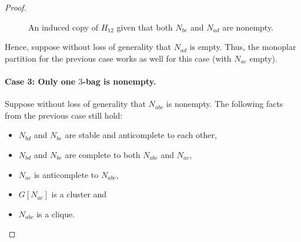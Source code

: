 \begin{proof}
    \begin{figure}[htb!]
        \centering
        \caption{An induced copy of $H_{12}$ given that both $ N_{be}$ and
            $N_{ad}$ are nonempty.}
        \label{fig:two_2_bags_nonempty_2}
    \end{figure}
    
    Hence, suppose without loss of generality that $N_{ad}$ is empty. Thus, the
    monoplar partition for the previous case works as well for this case (with
    $N_{ac}$ empty).
    
    \paragraph{Case 3: Only one $3$-bag is nonempty.} Suppose without loss of
    generality that $N_{abc}$ is nonempty. The following facts from the previous
    case still hold:

    \begin{itemize}
        \item $N_{bd}$ and $N_{be}$ are stable and anticomplete to each other,
        \item $N_{bd}$ and $N_{be}$ are complete to both $N_{abc}$ and $N_{ac}$,
        \item $N_{ac}$ is anticomplete to $N_{abc}$,
        \item $G[N_{ac}]$ is a cluster and
        \item $N_{abc}$ is a clique.
    \end{itemize}


\end{proof}
